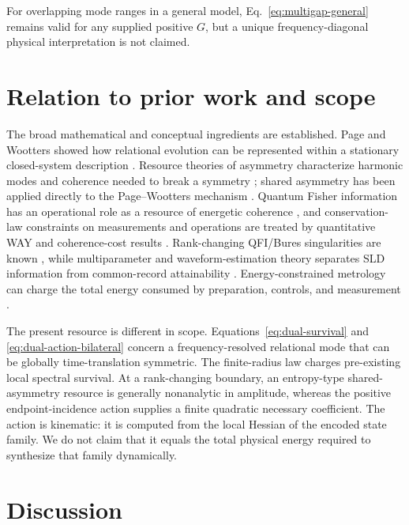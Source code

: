 \documentclass[aps,pra,preprint,nofootinbib]{revtex4-2}
\begin{document}
For overlapping mode ranges in a general model, Eq.~\eqref{eq:multigap-general} remains valid for any supplied positive $G$, but a unique frequency-diagonal physical interpretation is not claimed.

\section{Relation to prior work and scope}
\label{sec:prior}

The broad mathematical and conceptual ingredients are established. Page and Wootters showed how relational evolution can be represented within a stationary closed-system description \cite{PageWootters1983}. Resource theories of asymmetry characterize harmonic modes and coherence needed to break a symmetry \cite{MarvianSpekkens2014Modes}; shared asymmetry has been applied directly to the Page--Wootters mechanism \cite{CarmoSoaresPinto2021}. Quantum Fisher information has an operational role as a resource of energetic coherence \cite{Marvian2022,YamaguchiTajima2023}, and conservation-law constraints on measurements and operations are treated by quantitative WAY and coherence-cost results \cite{MarvianSpekkensWAY2012,TajimaShiraishiSaito2020}. Rank-changing QFI/Bures singularities are known \cite{Safranek2017}, while multiparameter and waveform-estimation theory separates SLD information from common-record attainability \cite{GillMassar2000,LiEtAl2016,GardnerEtAl2024}. Energy-constrained metrology can charge the total energy consumed by preparation, controls, and measurement \cite{ChenYang2026}.

The present resource is different in scope. Equations~\eqref{eq:dual-survival} and \eqref{eq:dual-action-bilateral} concern a frequency-resolved relational mode that can be globally time-translation symmetric. The finite-radius law charges pre-existing local spectral survival. At a rank-changing boundary, an entropy-type shared-asymmetry resource is generally nonanalytic in amplitude, whereas the positive endpoint-incidence action supplies a finite quadratic necessary coefficient. The action is kinematic: it is computed from the local Hessian of the encoded state family. We do not claim that it equals the total physical energy required to synthesize that family dynamically.

\section{Discussion}
\label{sec:discussion}
\end{document}
